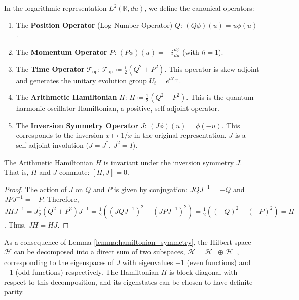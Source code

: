 \begin{definition}
\label{def:fundamental_operators}
In the logarithmic representation $L^2(\mathbb{R}, du)$, we define the canonical operators:
\begin{enumerate}[label=(\roman*), wide, labelindent=0pt]
    \item The \textbf{Position Operator} (Log-Number Operator) $Q$: $(Q\phi)(u) = u\phi(u)$.
    \item The \textbf{Momentum Operator} $P$: $(P\phi)(u) = -i\frac{d\phi}{du}$ (with $\hbar=1$).
    \item The \textbf{Time Operator} $\mathcal{T}_{\text{op}}$: $\mathcal{T}_{\text{op}} \coloneqq \frac{i}{2}(Q^2 + P^2)$. This operator is skew-adjoint and generates the unitary evolution group $U_t = e^{t\mathcal{T}_{\text{op}}}$.
    \item The \textbf{Arithmetic Hamiltonian} $H$: $H \coloneqq \frac{1}{2}(Q^2 + P^2)$. This is the quantum harmonic oscillator Hamiltonian, a positive, self-adjoint operator.
    \item The \textbf{Inversion Symmetry Operator} $J$: $(J\phi)(u) = \phi(-u)$. This corresponds to the inversion $x \mapsto 1/x$ in the original representation. $J$ is a self-adjoint involution ($J=J^*$, $J^2=I$).
\end{enumerate}
\end{definition}

\begin{lemma}
\label{lemma:hamiltonian_symmetry}
The Arithmetic Hamiltonian $H$ is invariant under the inversion symmetry $J$. That is, $H$ and $J$ commute: $[H, J] = 0$.
\end{lemma}
\begin{proof}
The action of $J$ on $Q$ and $P$ is given by conjugation: $J Q J^{-1} = -Q$ and $J P J^{-1} = -P$.
Therefore, $J H J^{-1} = J \frac{1}{2}(Q^2 + P^2) J^{-1} = \frac{1}{2}((JQJ^{-1})^2 + (JPJ^{-1})^2) = \frac{1}{2}((-Q)^2 + (-P)^2) = H$. Thus, $JH = HJ$.
\end{proof}

\begin{corollary}
\label{cor:parity_of_eigenstates}
As a consequence of Lemma \ref{lemma:hamiltonian_symmetry}, the Hilbert space $\mathcal{H}$ can be decomposed into a direct sum of two subspaces, $\mathcal{H} = \mathcal{H}_+ \oplus \mathcal{H}_-$, corresponding to the eigenspaces of $J$ with eigenvalues $+1$ (even functions) and $-1$ (odd functions) respectively. The Hamiltonian $H$ is block-diagonal with respect to this decomposition, and its eigenstates can be chosen to have definite parity.
\end{corollary}

